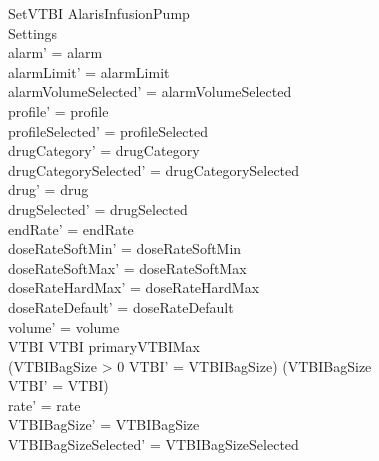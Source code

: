 \begin{schema}{SetVTBI}
	\Delta AlarisInfusionPump\\
	 Settings\\
	\where
	alarm' = alarm\\
	alarmLimit' = alarmLimit\\
	alarmVolumeSelected' = alarmVolumeSelected\\
	profile' = profile\\
	profileSelected' = profileSelected\\
	drugCategory' = drugCategory\\ 
	\pagebreak
	drugCategorySelected' = drugCategorySelected\\
	drug' = drug\\ 
	drugSelected' = drugSelected\\
	endRate' = endRate\\
	doseRateSoftMin' = doseRateSoftMin\\
	doseRateSoftMax' = doseRateSoftMax\\
	doseRateHardMax' = doseRateHardMax\\
	doseRateDefault' = doseRateDefault\\
	volume' = volume\\
	VTBI  \land VTBI \leq primaryVTBIMax\\
	(VTBIBagSize > 0 \land VTBI' = VTBIBagSize) \lor (VTBIBagSize  \\
	\land VTBI' = VTBI)\\
	rate' = rate\\
	VTBIBagSize' = VTBIBagSize\\ 
	VTBIBagSizeSelected' = VTBIBagSizeSelected\\

\end{schema}
